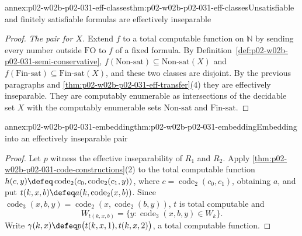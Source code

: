 \begin{annexitem}{annex:p02-w02b-p02-031-eff-classes}{thm:p02-w02b-p02-031-eff-classes}{Unsatisfiable and finitely satisfiable formulas are effectively inseparable}
\begin{proof}
\emph{The pair for \(X\).}  Extend \(f\) to a total computable function on
\(\mathbb N\) by sending every number outside \(\mathrm{FO}\) to \(f\) of a
fixed formula.  By
Definition~\ref{def:p02-w02b-p02-031-semi-conservative},
\(f(\mathrm{Non\text{-}sat})\subseteq\mathrm{Non\text{-}sat}(X)\) and
\(f(\mathrm{Fin\text{-}sat})\subseteq\mathrm{Fin\text{-}sat}(X)\), and these
two classes are disjoint.  By the previous paragraphs and
\cref{thm:p02-w02b-p02-031-eff-transfer}(4) they are effectively inseparable.
They are computably enumerable as intersections of the decidable set \(X\) with
the computably enumerable sets \(\mathrm{Non\text{-}sat}\) and
\(\mathrm{Fin\text{-}sat}\).
\end{proof}
\end{annexitem}

\begin{annexitem}{annex:p02-w02b-p02-031-embedding}{thm:p02-w02b-p02-031-embedding}{Embedding into an effectively inseparable pair}
\begin{proof}
Let \(p\) witness the effective inseparability of \(R_1\) and \(R_2\).  Apply
\cref{thm:p02-w02b-p02-031-code-constructions}(2) to the total computable
function \(h(c,y)\defeq\operatorname{code}_2(c_0,\operatorname{code}_2(c_1,y))\),
where \(c=\operatorname{code}_2(c_0,c_1)\), obtaining \(a\), and put
\(t(k,x,b)\defeq a(k,\operatorname{code}_2(x,b))\).  Since
\(\operatorname{code}_3(x,b,y)=\operatorname{code}_2(x,\operatorname{code}_2(b,y))\),
\(t\) is total computable and
\[
 W_{t(k,x,b)}=\{y:\operatorname{code}_3(x,b,y)\in W_k\}.
 \tag{1}
\]
Write \(\gamma(k,x)\defeq p\bigl(t(k,x,1),t(k,x,2)\bigr)\), a total computable
function.


\end{proof}
\end{annexitem}
